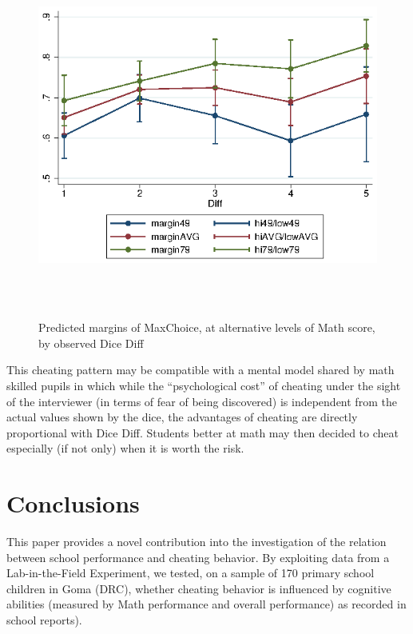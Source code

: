 \documentclass[authoryear, preprint, review, 12pt]{elsarticle}
\begin{document}
\begin{figure}[h!]
\centering
\includegraphics[width=12cm,height=12cm, keepaspectratio]{figures/margins_ci.eps}
\caption{\label{fig:margins} Predicted margins of MaxChoice, at alternative levels of Math score, by observed Dice Diff}
\end{figure}

This cheating pattern may be compatible with a mental model shared by math skilled pupils in which while the \enquote{psychological cost} of cheating under the sight of the interviewer (in terms of fear of being discovered) is independent from the actual values shown by the dice, the advantages of cheating are directly proportional with Dice Diff. Students better at math may then decided to cheat especially (if not only) when it is worth the risk.   

\section{Conclusions}
\label{sec:conclusion}
This paper provides a novel contribution into the investigation of the relation between school performance and cheating behavior. By exploiting data from a Lab-in-the-Field Experiment, we tested, on a sample of 170 primary school children in Goma (DRC), whether cheating behavior is influenced by cognitive abilities (measured by Math performance and overall performance) as recorded in school reports).  
\end{document}
